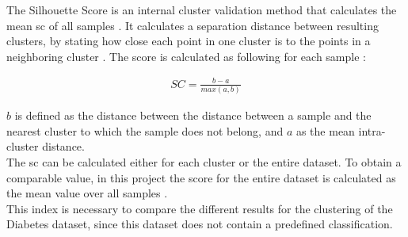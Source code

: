 The Silhouette Score is an internal cluster validation method that calculates the mean \acrfull{sc} of all samples \cite{scikitlearn}. It calculates a separation distance between resulting clusters, by stating how close each point in one cluster is to the points in a neighboring cluster \cite{sil_score}. The score is calculated as following for each sample \cite{scikitlearn}: 

\begin{align}
    SC = \frac{b-a}{max(a,b)}
\end{align}

$b$ is defined as the distance between the distance between a sample and the nearest cluster to which the sample does not belong, and $a$ as the mean intra-cluster distance.\\
The \acrshort{sc} can be calculated either for each cluster or the entire dataset. To obtain a comparable value, in this project the score for the entire dataset is calculated as the mean value over all samples \cite{scikitlearn}.\\
This index is necessary to compare the different results for the clustering of the Diabetes dataset, since this dataset does not contain a predefined classification.